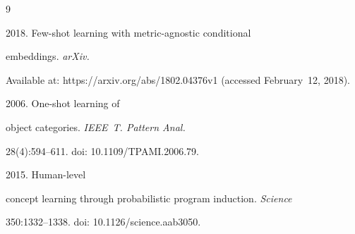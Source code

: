 














\renewcommand{\bibname}{\protect\rmfamily References}




{\small\frenchspacing

{%


\begin{thebibliography}{9}


    2018. Few-shot learning with metric-agnostic conditional 

embeddings. \textit{arXiv.}

       Available at: {\sf https://arxiv.org/abs/1802.04376v1} (accessed February~12,  2018).

       


    2006. One-shot learning of 

object categories. \textit{IEEE~T. Pattern Anal.} 

28(4):594--611. doi: 10.1109\!/\!TPAMI.2006.79.


    2015. Human-level 

concept learning through probabilistic program induction. \textit{Science} 

350:1332--1338. doi: 10.1126\!/\linebreak science.aab3050.

  

\end{thebibliography}

} }





